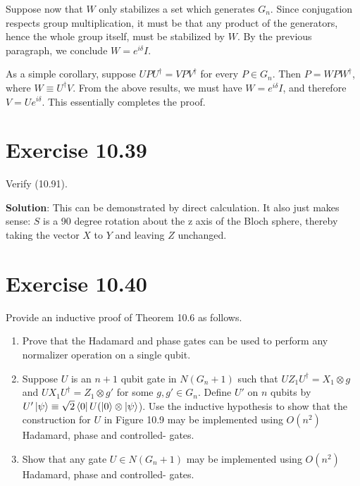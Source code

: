 \documentclass{book}
\begin{document}
    Suppose now that $W$ only stabilizes a set which generates $G_n$. Since conjugation respects group multiplication, it must be that any product of the generators, hence the whole group itself, must be stabilized by $W$. By the previous paragraph, we conclude $W = e^{i\delta} I $.
    
    As a simple corollary, suppose $U P U^\dagger = V P V^\dagger$ for every $P\in G_n$. Then $P = W P W^\dagger$, where $W \equiv U^\dagger V$. From the above results, we must have $W = e^{i\delta}I$, and therefore $V = U e^{i\delta}$. This essentially completes the proof.
    
\section*{Exercise 10.39}
    Verify (10.91).
    
    \textbf{Solution}: This can be demonstrated by direct calculation. It also just makes sense: $S$ is a 90 degree rotation about the z axis of the Bloch sphere, thereby taking the vector $X$ to $Y$ and leaving $Z$ unchanged. 
    
\section*{Exercise 10.40}
    Provide an inductive proof of Theorem 10.6 as follows.
    \begin{enumerate}
        \item Prove that the Hadamard and phase gates can be used to perform any normalizer operation on a single qubit.
    
        \item Suppose $U$ is an $n+1$ qubit gate in $N(G_n+1)$ such that $U Z_1 U^\dagger = X_1 \otimes g$ and $U X_1 U^\dagger = Z_1 \otimes g'$ for some $g,g' \in G_n$. Define $U'$ on $n$ qubits by $U'\ket{\psi} \equiv \sqrt{2}\bra{0} U (\ket{0} \otimes \ket{\psi}$). Use the inductive hypothesis to show that the construction for $U$ in Figure 10.9 may be implemented using $O(n^2)$ Hadamard, phase and controlled- gates.
    
        \item Show that any gate $U \in N(G_n+1)$ may be implemented using $O(n^2)$ Hadamard, phase and controlled- gates.
    \end{enumerate}
    
\end{document}
